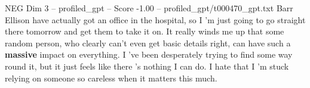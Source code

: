 \begin{textsample}{NEG Dim 3 – profiled\_gpt – Score -1.00 – profiled\_gpt/t000470\_gpt.txt}  \label{ex:f3_neg_030}
Barr Ellison have actually got an office in the hospital, so I ’m just going to go straight there tomorrow and get them to take it on.
It really winds me up that some random person, who clearly can't even get basic details right, can have such a \textbf{massive} impact on everything.
I ’ve been desperately trying to find some way round it, but it just feels like there ’s nothing I can do.
I hate that I ’m stuck relying on someone so careless when it matters this much.

\end{textsample}
